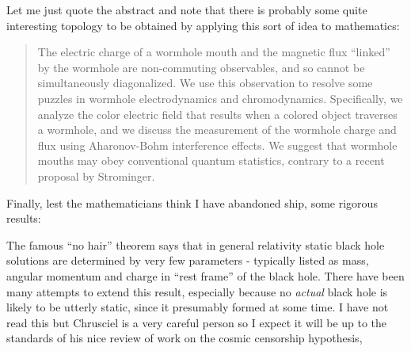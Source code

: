 \documentclass{article}
\def\tightlist{}
\renewcommand{\texttt}[1]{%
  \begingroup
  \ttfamily
  \begingroup\lccode`~=`/\lowercase{\endgroup\def~}{/\discretionary{}{}{}}%
  \begingroup\lccode`~=`[\lowercase{\endgroup\def~}{[\discretionary{}{}{}}%
  \begingroup\lccode`~=`.\lowercase{\endgroup\def~}{.\discretionary{}{}{}}%
  \catcode`/=\active\catcode`[=\active\catcode`.=\active
  \scantokens{#1\noexpand}%
  \endgroup
}
\begin{document}

Let me just quote the abstract and note that there is probably some
quite interesting topology to be obtained by applying this sort of idea
to mathematics:

\begin{quote}
The electric charge of a wormhole mouth and the magnetic flux ``linked''
by the wormhole are non-commuting observables, and so cannot be
simultaneously diagonalized. We use this observation to resolve some
puzzles in wormhole electrodynamics and chromodynamics. Specifically, we
analyze the color electric field that results when a colored object
traverses a wormhole, and we discuss the measurement of the wormhole
charge and flux using Aharonov-Bohm interference effects. We suggest
that wormhole mouths may obey conventional quantum statistics, contrary
to a recent proposal by Strominger.
\end{quote}

Finally, lest the mathematicians think I have abandoned ship, some
rigorous results:


The famous ``no hair'' theorem says that in general relativity static
black hole solutions are determined by very few parameters - typically
listed as mass, angular momentum and charge in ``rest frame'' of the
black hole. There have been many attempts to extend this result,
especially because no \emph{actual} black hole is likely to be utterly
static, since it presumably formed at some time. I have not read this
but Chrusciel is a very careful person so I expect it will be up to the
standards of his nice review of work on the cosmic censorship
hypothesis,
\end{document}
